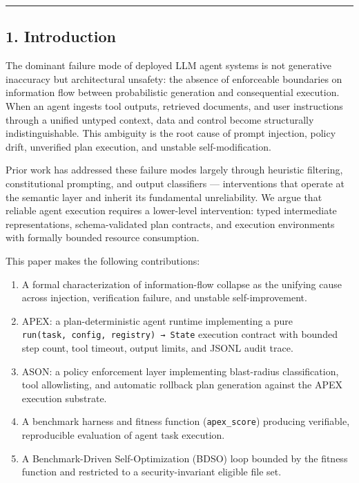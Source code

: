 \documentclass[
]{article}
\providecommand{\tightlist}{%
  \setlength{\itemsep}{0pt}\setlength{\parskip}{0pt}}
\begin{document}
\begin{center}\rule{0.5\linewidth}{0.5pt}\end{center}

\subsection{1. Introduction}\label{1-introduction}

The dominant failure mode of deployed LLM agent systems is not
generative inaccuracy but architectural unsafety: the absence of
enforceable boundaries on information flow between probabilistic
generation and consequential execution. When an agent ingests tool
outputs, retrieved documents, and user instructions through a unified
untyped context, data and control become structurally indistinguishable.
This ambiguity is the root cause of prompt injection, policy drift,
unverified plan execution, and unstable self-modification.

Prior work has addressed these failure modes largely through heuristic
filtering, constitutional prompting, and output classifiers ---
interventions that operate at the semantic layer and inherit its
fundamental unreliability. We argue that reliable agent execution
requires a lower-level intervention: typed intermediate representations,
schema-validated plan contracts, and execution environments with
formally bounded resource consumption.

This paper makes the following contributions:

\begin{enumerate}
\def\labelenumi{\arabic{enumi}.}
\tightlist
\item
  A formal characterization of information-flow collapse as the unifying
  cause across injection, verification failure, and unstable
  self-improvement.
\item
  APEX: a plan-deterministic agent runtime implementing a pure
  \texttt{run(task,\ config,\ registry)\ →\ State} execution contract
  with bounded step count, tool timeout, output limits, and JSONL audit
  trace.
\item
  ASON: a policy enforcement layer implementing blast-radius
  classification, tool allowlisting, and automatic rollback plan
  generation against the APEX execution substrate.
\item
  A benchmark harness and fitness function (\texttt{apex\_score})
  producing verifiable, reproducible evaluation of agent task execution.
\item
  A Benchmark-Driven Self-Optimization (BDSO) loop bounded by the
  fitness function and restricted to a security-invariant eligible file
  set.
\end{enumerate}
\end{document}
